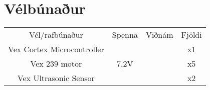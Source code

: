 \section{Vélbúnaður}

\begin{center}
\begin{tabular}{ |c|c|c|c| } 
 \hline
 Vél/rafbúnaður &Spenna &Viðnám &Fjöldi\\ 
 Vex Cortex Microcontroller & & &x1\\ 
 Vex 239 motor & 7,2V & & x5  \\ 
 Vex Ultrasonic Sensor & & & x2 \\
 \hline
\end{tabular}
\end{center}